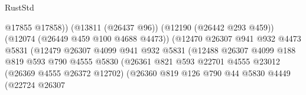 \begin{lexlean}{RustStd}
\begin{coremodule}
                                                    @17855
                                                    @17858))
                                                (@13811 (@26437 @96))
                                                (@12190 (@26442 @293 @459))
                                                (@12074 (@26449 @459 @100 @4688 @4473))
                                                (@12470
                                                  @26307
                                                  @941
                                                  @932
                                                  @4473
                                                  @5831
                                                  (@12479
                                                    @26307
                                                    @4099
                                                    @941
                                                    @932
                                                    @5831
                                                    (@12488
                                                      @26307
                                                      @4099
                                                      @188
                                                      @819
                                                      @593
                                                      @790
                                                      @4555
                                                      @5830
                                                      (@26361
                                                        @821
                                                        @593
                                                        @22701
                                                        @4555
                                                        @23012
                                                        (@26369 @4555 @26372 @12702)
                                                        (@26360
                                                          @819
                                                          @126
                                                          @790
                                                          @44
                                                          @5830
                                                          @4449
                                                          (@22724
                                                            @26307

\end{coremodule}
\end{lexlean}
